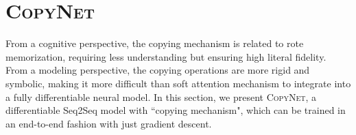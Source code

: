 


\section{\textsc{CopyNet}}
From a cognitive perspective, the copying mechanism is related to rote memorization, requiring less understanding but ensuring high literal fidelity. From a modeling perspective, the copying operations are more rigid and symbolic, making it more difficult than soft attention mechanism to integrate into a fully differentiable neural model.
In this section, we present \textsc{CopyNet}, a differentiable Seq2Seq model with ``copying mechanism", which can be trained in an end-to-end fashion with just gradient descent. 


